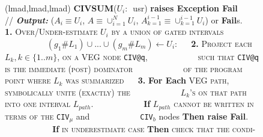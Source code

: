 \documentclass{sig-alternate}
\begin{document}
\begin{figure}[t]
\begin{small}
({\sc lmad},{\sc lmad},{\sc lmad}) {\bf CIVSUM}($U_i :$~{\sc{}usr}) {\bf raises Exception Fail}\vspace{1ex} \newline
$\mbox{ }\mbox{ }$// {\bf {\em Output:}} 
($A_i \equiv U_i$, $A \equiv \cup_{i=1}^{N} U_i$, $A_{k=1}^{i-1} \equiv \cup_{k=1}^{i-1} U_i$) or {\bf Fail}s. \vspace{2ex} \newline
$\mbox{ }\mbox{ }${\bf1.} \textsc{Over/Under-estimate $U_i$ by a union of gated intervals}\vspace{1ex} \newline
$\mbox{ }\mbox{ }\mbox{ }\mbox{ }\mbox{ }\mbox{ }\mbox{ }$ $(g_1\#L_1) \cup ... \cup (g_m\#L_m)\leftarrow U_i$: \vspace{2ex} \newline
$\mbox{ }\mbox{ }${\bf2.} \textsc{Project each} $L_k, k\in\{1..m\}$, \textsc{on a VEG node} {\tt CIV@q}, \vspace{1ex} \newline
$\mbox{ }\mbox{ }\mbox{ }\mbox{ }\mbox{ }\mbox{ }\mbox{ }\mbox{ }$
            \textsc{such that} {\tt CIV@q} \textsc{is the immediate (post) dominator} \vspace{1ex} \newline 
$\mbox{ }\mbox{ }\mbox{ }\mbox{ }\mbox{ }\mbox{ }\mbox{ }\mbox{ }$
            \textsc{of the program point where} $L_k$ \textsc{was summarized} \vspace{2ex} \newline 
$\mbox{ }\mbox{ }${\bf3.} {\bf For Each} \textsc{VEG path, symbolically unite (exactly) the}\vspace{1ex} \newline 
$\mbox{ }\mbox{ }\mbox{ }\mbox{ }\mbox{ }\mbox{ }\mbox{ }\mbox{ }$
            \textsc{$L_k$'s on that path into one interval $L_{path}$.}\vspace{1.5ex}\newline 
$\mbox{ }\mbox{ }\mbox{ }\mbox{ }\mbox{ }\mbox{ }\mbox{ }\mbox{ }$
            {\bf If} $L_{path}$ \textsc{cannot be written in terms of the} {\tt CIV$_\mu$} {\sc and} 
$\mbox{ }\mbox{ }\mbox{ }\mbox{ }\mbox{ }\mbox{ }\mbox{ }\mbox{ }$
            {\tt CIV$_b$} {\sc nodes} {\bf Then raise Fail}.\vspace{1.5ex} \newline
$\mbox{ }\mbox{ }\mbox{ }\mbox{ }\mbox{ }\mbox{ }\mbox{ }\mbox{ }$
            {\bf If} \textsc{in underestimate case} {\bf Then} \textsc{check that the condi-}

\end{small}
\end{figure}
\end{document}
